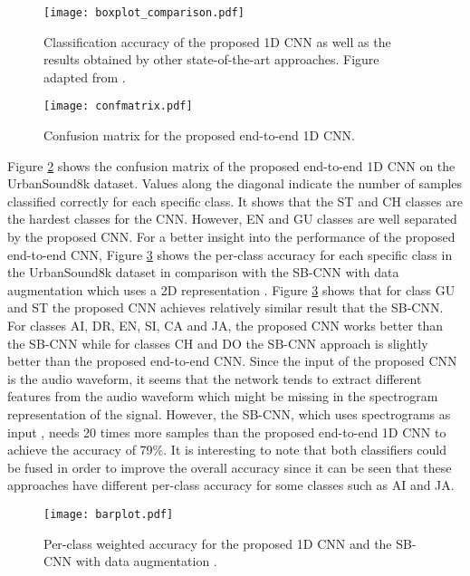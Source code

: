 \documentclass[preprint,final,12pt]{elsarticle}
\begin{document}
\begin{figure}[htpb!]
  \centering
  \centerline{\texttt{[image: boxplot\_comparison.pdf]}}
\caption{Classification accuracy of the proposed 1D CNN as well as the results obtained by other state-of-the-art approaches. Figure adapted from \citep{2017deepsalamon}.}
\label{fig:boxall}
\end{figure}



\begin{figure}[htpb!]
\begin{minipage}[b]{1.0\linewidth}
  \centering
  \centerline{\texttt{[image: confmatrix.pdf]}}
\end{minipage}
\caption{Confusion matrix for the proposed end-to-end 1D CNN.}
\label{fig:confusion}
\end{figure}
Figure \ref{fig:confusion} shows the confusion matrix of the proposed end-to-end 1D CNN on the UrbanSound8k dataset. Values along the diagonal indicate the number of samples classified correctly for each specific class. It shows that the ST and CH classes are the hardest classes for the CNN. However, EN and GU classes are well separated by the proposed CNN. For a better insight into the performance of the proposed end-to-end CNN, Figure \ref{fig:comparison} shows the per-class accuracy for each specific class in the UrbanSound8k dataset in comparison with the SB-CNN with data augmentation which uses a 2D representation \citep{2017deepsalamon}. Figure \ref{fig:comparison} shows that for class GU and ST the proposed CNN achieves relatively similar result that the SB-CNN. For classes AI, DR, EN, SI, CA and JA, the proposed CNN works better than the SB-CNN while for classes CH and DO the SB-CNN approach is slightly better than the proposed end-to-end CNN. Since the input of the proposed CNN is the audio waveform, it seems that the network tends to extract different features from the audio waveform which might be missing in the spectrogram representation of the signal. However, the SB-CNN, which uses spectrograms as input \citep{2017deepsalamon}, needs 20 times more samples than the proposed end-to-end 1D CNN to achieve the accuracy of 79\%. It is interesting to note that both classifiers could be fused in order to improve the overall accuracy since it can be seen that these approaches have different per-class accuracy for some classes such as AI and JA.

\begin{figure}[htpb!]
\begin{minipage}[b]{1.0\linewidth}
  \centering
  \centerline{\texttt{[image: barplot.pdf]}}
\end{minipage}
\caption{Per-class weighted accuracy for the proposed 1D CNN and the SB-CNN with data augmentation \citep{2017deepsalamon}.}
\label{fig:comparison}
\end{figure}
\end{document}
